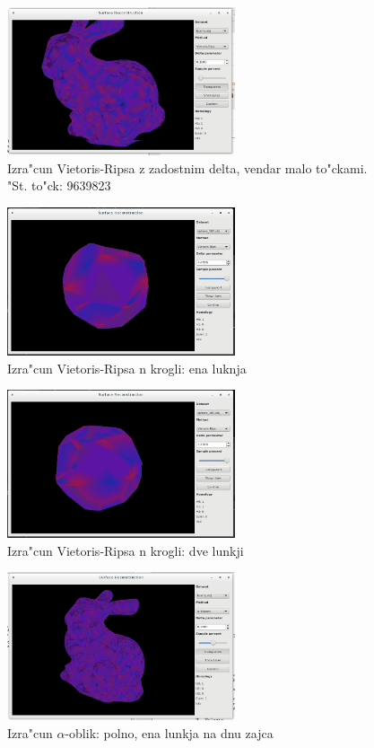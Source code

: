 \documentclass[11pt]{article}
\begin{document}
\begin{figure}[htb]
    \centering
    \includegraphics[width=0.6\textwidth]{vr_full_9639823.png}
    \caption{Izra"cun Vietoris-Ripsa z zadostnim delta, vendar malo to"ckami. "St. to"ck: 9639823}
    \label{fig:vr2}
\end{figure}

\begin{figure}[htb]
    \centering
    \includegraphics[width=0.6\textwidth]{vr_1hole.png}
    \caption{Izra"cun Vietoris-Ripsa n krogli: ena luknja}
    \label{fig:vr3}
\end{figure}

\begin{figure}[htb]
    \centering
    \includegraphics[width=0.6\textwidth]{vr_2hole.png}
    \caption{Izra"cun Vietoris-Ripsa n krogli: dve lunkji}
    \label{fig:vr4}
\end{figure}

\begin{figure}[htb]
    \centering
    \includegraphics[width=0.6\textwidth]{alpha_full.png}
    \caption{Izra"cun $\alpha$-oblik: polno, ena lunkja na dnu zajca}
    \label{fig:a1}
\end{figure}
\end{document}
